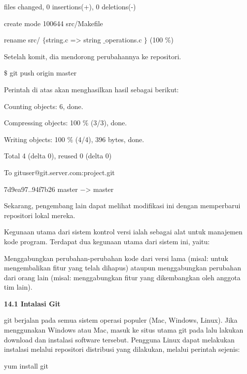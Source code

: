  files changed, 0 insertions(+), 0 deletions(-) \par
\noindent 
create mode 100644 src/Makefile \par
\noindent 
rename src/ $  \{  $string.c => string $  \_  $operations.c $  \}  $ (100 $  \%  $) \par
\vspace{12pt}
\noindent 
Setelah komit, dia mendorong perubahannya ke repositori. \par
{} $  \$  $ git push origin master \par
\vspace{12pt}
\noindent 
Perintah di atas akan menghasilkan hasil sebagai berikut: \par
\noindent 
Counting objects: 6, done. \par
\noindent 
Compressing objects: 100 $  \%  $ (3/3), done. \par
\noindent 
Writing objects: 100 $  \%  $ (4/4), 396 bytes, done. \par
\noindent 
Total 4 (delta 0), reused 0 (delta 0) \par
\noindent 
To gituser@git.server.com:project.git \par
\noindent 
7d9ea97..94f7b26 master  $ - $> master \par
\vspace{12pt}
Sekarang, pengembang lain dapat melihat modifikasi ini dengan memperbarui repositori lokal mereka. \par
Kegunaan utama dari sistem kontrol versi ialah sebagai alat untuk manajemen kode program. Terdapat dua kegunaan utama dari sistem ini, yaitu: \par
\noindent 
Menggabungkan perubahan-perubahan kode dari versi lama (misal: untuk mengembalikan fitur yang telah dihapus) ataupun menggabungkan perubahan dari orang lain (misal: menggabungkan fitur yang dikembangkan oleh anggota tim lain).
 \par
\vspace{12pt}
\noindent 
\textbf{14.1 Intalasi Git} \par
git berjalan pada semua sistem operasi populer (Mac, Windows, Linux). Jika menggunakan Windows atau Mac, masuk ke situs utama git pada 
 lalu lakukan download dan instalasi software tersebut. Pengguna Linux dapat melakukan instalasi melalui repositori distribusi yang dilakukan, melalui perintah sejenis: \par
\noindent 
{\fontsize{10pt}{10pt}\selectfont yum install git} \par
